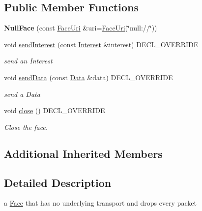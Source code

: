 \subsection*{Public Member Functions}
\begin{DoxyCompactItemize}
\item 
{\bfseries Null\+Face} (const \hyperlink{classndn_1_1util_1_1FaceUri}{Face\+Uri} \&uri=\hyperlink{classndn_1_1util_1_1FaceUri}{Face\+Uri}(\char`\"{}null\+://\char`\"{}))\hypertarget{classnfd_1_1NullFace_a40cbf74616c3b69d4d05fc90ee1b2f0d}{}\label{classnfd_1_1NullFace_a40cbf74616c3b69d4d05fc90ee1b2f0d}

\item 
void \hyperlink{classnfd_1_1NullFace_af71cbafb102f1f8c5072e4b1c14f2514}{send\+Interest} (const \hyperlink{classndn_1_1Interest}{Interest} \&interest) D\+E\+C\+L\+\_\+\+O\+V\+E\+R\+R\+I\+DE\hypertarget{classnfd_1_1NullFace_af71cbafb102f1f8c5072e4b1c14f2514}{}\label{classnfd_1_1NullFace_af71cbafb102f1f8c5072e4b1c14f2514}

\begin{DoxyCompactList}\small\item\em send an Interest \end{DoxyCompactList}\item 
void \hyperlink{classnfd_1_1NullFace_ac39dd70898fb9683edb1d5b06114c78e}{send\+Data} (const \hyperlink{classndn_1_1Data}{Data} \&data) D\+E\+C\+L\+\_\+\+O\+V\+E\+R\+R\+I\+DE\hypertarget{classnfd_1_1NullFace_ac39dd70898fb9683edb1d5b06114c78e}{}\label{classnfd_1_1NullFace_ac39dd70898fb9683edb1d5b06114c78e}

\begin{DoxyCompactList}\small\item\em send a Data \end{DoxyCompactList}\item 
void \hyperlink{classnfd_1_1NullFace_a8b6432036a231c31b6d0be68174d1351}{close} () D\+E\+C\+L\+\_\+\+O\+V\+E\+R\+R\+I\+DE
\begin{DoxyCompactList}\small\item\em Close the face. \end{DoxyCompactList}\end{DoxyCompactItemize}
\subsection*{Additional Inherited Members}


\subsection{Detailed Description}
a \hyperlink{classnfd_1_1Face}{Face} that has no underlying transport and drops every packet 

